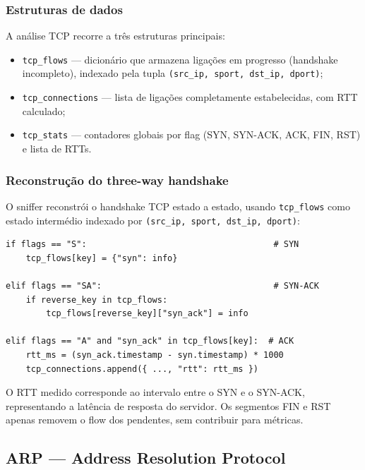 \documentclass[a4paper,12pt]{article}
\begin{document}
\subsubsection{Estruturas de dados}
 
A análise TCP recorre a três estruturas principais:
 
\begin{itemize}
    \item \texttt{tcp\_flows} — dicionário que armazena ligações em progresso (handshake incompleto), indexado pela tupla \texttt{(src\_ip, sport, dst\_ip, dport)};
    \item \texttt{tcp\_connections} — lista de ligações completamente estabelecidas, com RTT calculado;
    \item \texttt{tcp\_stats} — contadores globais por flag (SYN, SYN-ACK, ACK, FIN, RST) e lista de RTTs.
\end{itemize}


\subsubsection{Reconstrução do three-way handshake}
 
O sniffer reconstrói o handshake TCP estado a estado, usando \texttt{tcp\_flows} como estado intermédio indexado por \texttt{(src\_ip, sport, dst\_ip, dport)}:
 
\vspace{0.5em}

\begin{lstlisting}[style=python]
if flags == "S":                                     # SYN
    tcp_flows[key] = {"syn": info}
 
elif flags == "SA":                                  # SYN-ACK
    if reverse_key in tcp_flows:
        tcp_flows[reverse_key]["syn_ack"] = info
 
elif flags == "A" and "syn_ack" in tcp_flows[key]:  # ACK
    rtt_ms = (syn_ack.timestamp - syn.timestamp) * 1000
    tcp_connections.append({ ..., "rtt": rtt_ms })
\end{lstlisting}
 
O RTT medido corresponde ao intervalo entre o SYN e o SYN-ACK, representando a latência de resposta do servidor.
Os segmentos FIN e RST apenas removem o flow dos pendentes, sem contribuir para métricas.

\subsection{ARP — Address Resolution Protocol}
\end{document}
